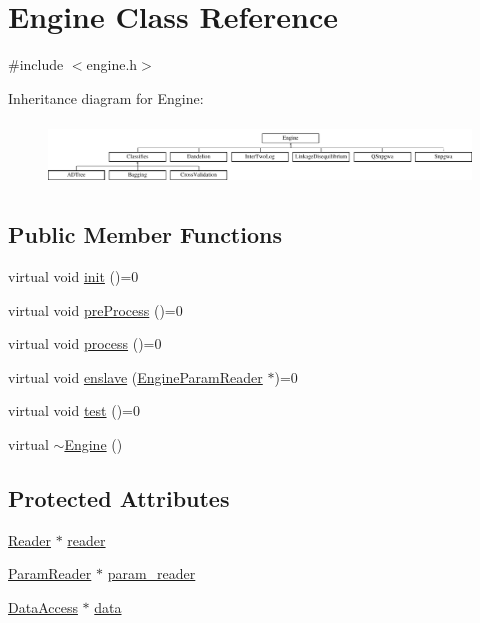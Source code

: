 \hypertarget{classEngine}{
\section{Engine Class Reference}
\label{classEngine}
}


{\ttfamily \#include $<$engine.h$>$}

Inheritance diagram for Engine:\begin{figure}[H]
\begin{center}
\leavevmode
\includegraphics[height=1.69014cm]{classEngine}
\end{center}
\end{figure}
\subsection*{Public Member Functions}
\begin{DoxyCompactItemize}
\item 
virtual void \hyperlink{classEngine_aaa054d596fb8ced6e3eb4bee208f8c3d}{init} ()=0
\item 
virtual void \hyperlink{classEngine_aec7076b8979a13c96eceb362437dc68c}{preProcess} ()=0
\item 
virtual void \hyperlink{classEngine_a005f8e277c3dea16ea05803fba223db7}{process} ()=0
\item 
virtual void \hyperlink{classEngine_a023e094182312b1732fe53754c2fe5cb}{enslave} (\hyperlink{classEngineParamReader}{EngineParamReader} $\ast$)=0
\item 
virtual void \hyperlink{classEngine_a2927c4a4263809453063ad482c6434a4}{test} ()=0
\item 
virtual \hyperlink{classEngine_a41f2d854040e17d9c4d7b324a4bfbf39}{$\sim$Engine} ()
\end{DoxyCompactItemize}
\subsection*{Protected Attributes}
\begin{DoxyCompactItemize}
\item 
\hyperlink{classReader}{Reader} $\ast$ \hyperlink{classEngine_ab8f643f38543ba32dd856f15aa7899e8}{reader}
\item 
\hyperlink{classParamReader}{ParamReader} $\ast$ \hyperlink{classEngine_aa2b8bf8e8a8854d1eacda6bb1a4f4f37}{param\_\-reader}
\item 
\hyperlink{classDataAccess}{DataAccess} $\ast$ \hyperlink{classEngine_a92dad538992bac19762f6cc2a754962a}{data}
\end{DoxyCompactItemize}


